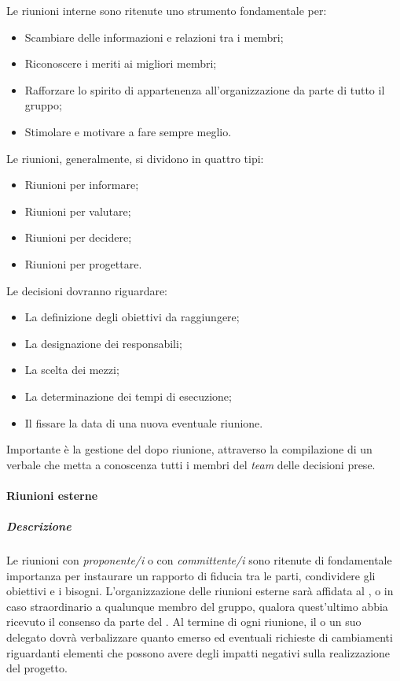Le riunioni interne sono ritenute uno strumento fondamentale per:
\begin{itemize}
\item
Scambiare delle informazioni e relazioni tra i membri;
\item
Riconoscere  i  meriti  ai  migliori membri;
\item
Rafforzare lo spirito di appartenenza all'organizzazione da parte di tutto il gruppo;
\item
Stimolare e motivare a fare sempre meglio.
\end{itemize}

Le riunioni, generalmente, si dividono in quattro tipi:
\begin{itemize}
\item
Riunioni per informare;
\item 
Riunioni per valutare;
\item
Riunioni per decidere;
\item 
Riunioni per progettare. 
\end{itemize}

Le decisioni dovranno riguardare:
\begin{itemize}
\item
La definizione degli obiettivi da raggiungere;
\item 
La designazione dei responsabili;
\item
La scelta dei mezzi;
\item
La determinazione dei tempi di esecuzione;
\item
Il fissare la data di una nuova eventuale riunione.
\end{itemize}

Importante è la gestione del dopo riunione, attraverso la compilazione di un verbale che metta a conoscenza tutti i membri del \textit{team} delle decisioni prese.

\paragraph{Riunioni esterne}
\subparagraph{Descrizione}
Le riunioni con \textit{proponente/i} o con \textit{committente/i} sono ritenute di fondamentale importanza per instaurare un rapporto di fiducia tra le parti, condividere gli obiettivi e i bisogni.
L'organizzazione delle riunioni esterne sarà affidata al \textit{\RdP}, o in caso straordinario a qualunque membro del gruppo, qualora quest'ultimo abbia ricevuto il consenso da parte del \textit{\RdP}.
Al termine di ogni riunione, il \textit{\RdP} o un suo delegato dovrà verbalizzare quanto emerso ed eventuali richieste di cambiamenti riguardanti elementi che possono avere degli impatti negativi sulla realizzazione del progetto.

